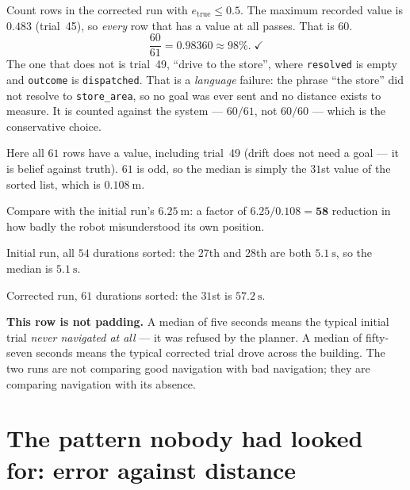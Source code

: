 \documentclass[11pt,a4paper]{report}
\newcommand{\file}[1]{\texttt{\small #1}}
\begin{document}
\begin{handbox}
Count rows in the corrected run with $e_{\text{true}} \le 0.5$. The maximum
recorded value is $0.483$ (trial~45), so \emph{every} row that has a value at
all passes. That is $60$.
\[
\frac{60}{61} = 0.98360 \approx 98\% . \;\checkmark
\]
The one that does not is trial~49, ``drive to the store'', where
\file{resolved} is empty and \file{outcome} is \file{dispatched}. That is a
\emph{language} failure: the phrase ``the store'' did not resolve to
\file{store\_area}, so no goal was ever sent and no distance exists to measure.
It is counted against the system --- $60/61$, not $60/60$ --- which is the
conservative choice.
\end{handbox}

\begin{handbox}[Entry 4: median $d_{\text{drift}} = 0.108$]
Here all $61$ rows have a value, including trial~49 (drift does not need a
goal --- it is belief against truth). $61$ is odd, so the median is simply the
$31$st value of the sorted list, which is $\SI{0.108}{\metre}$. \checkmark

Compare with the initial run's $\SI{6.25}{\metre}$: a factor of
$6.25 / 0.108 = \mathbf{58}$ reduction in how badly the robot misunderstood
its own position.
\end{handbox}

\begin{handbox}
Initial run, all $54$ durations sorted: the $27$th and $28$th are both
$\SI{5.1}{\second}$, so the median is $\SI{5.1}{\second}$. \checkmark

Corrected run, $61$ durations sorted: the $31$st is $\SI{57.2}{\second}$. \checkmark

\textbf{This row is not padding.} A median of five seconds means the typical
initial trial \emph{never navigated at all} --- it was refused by the planner.
A median of fifty-seven seconds means the typical corrected trial drove across
the building. The two runs are not comparing good navigation with bad
navigation; they are comparing navigation with its absence.
\end{handbox}

\section{The pattern nobody had looked for: error against distance}
\label{sec:hand-distance}
\end{document}
